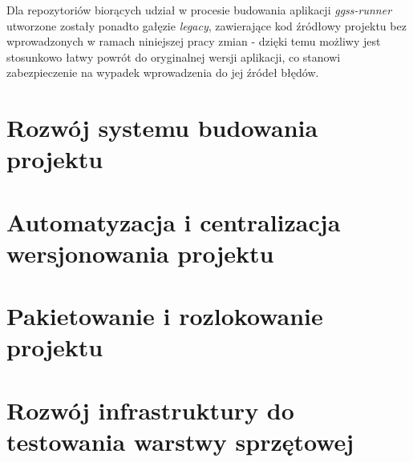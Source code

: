 Dla repozytoriów biorących udział w procesie budowania aplikacji \emph{ggss-runner} utworzone zostały ponadto gałęzie \emph{legacy}, zawierające kod źródłowy projektu bez wprowadzonych w ramach niniejszej pracy zmian - dzięki temu możliwy jest stosunkowo łatwy powrót do oryginalnej wersji aplikacji, co stanowi zabezpieczenie na wypadek wprowadzenia do jej źródeł błędów.





\section{Rozwój systemu budowania projektu}
\section{Automatyzacja i centralizacja wersjonowania projektu}
\section{Pakietowanie i rozlokowanie projektu}
\section{Rozwój infrastruktury do testowania warstwy sprzętowej}

